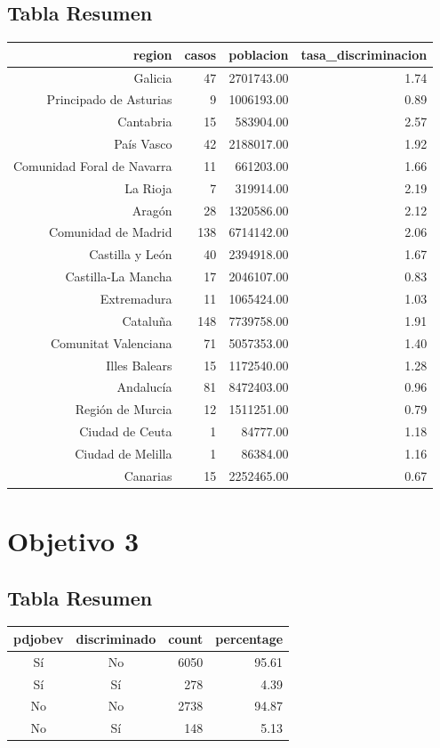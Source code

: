 \documentclass{article}
\begin{document}
\subsection{Tabla Resumen}
\begin{table}[ht]
\centering
\begin{tabular}{rrrr}
  \hline
region & casos & poblacion & tasa\_discriminacion \\ 
  \hline
Galicia &  47 & 2701743.00 & 1.74 \\ 
  Principado de Asturias &   9 & 1006193.00 & 0.89 \\ 
  Cantabria &  15 & 583904.00 & 2.57 \\ 
  País Vasco &  42 & 2188017.00 & 1.92 \\ 
  Comunidad Foral de Navarra &  11 & 661203.00 & 1.66 \\ 
  La Rioja &   7 & 319914.00 & 2.19 \\ 
  Aragón &  28 & 1320586.00 & 2.12 \\ 
  Comunidad de Madrid & 138 & 6714142.00 & 2.06 \\ 
  Castilla y León &  40 & 2394918.00 & 1.67 \\ 
  Castilla-La Mancha &  17 & 2046107.00 & 0.83 \\ 
  Extremadura &  11 & 1065424.00 & 1.03 \\ 
  Cataluña & 148 & 7739758.00 & 1.91 \\ 
  Comunitat Valenciana &  71 & 5057353.00 & 1.40 \\ 
  Illes Balears &  15 & 1172540.00 & 1.28 \\ 
  Andalucía &  81 & 8472403.00 & 0.96 \\ 
  Región de Murcia &  12 & 1511251.00 & 0.79 \\ 
  Ciudad de Ceuta &   1 & 84777.00 & 1.18 \\ 
  Ciudad de Melilla &   1 & 86384.00 & 1.16 \\ 
  Canarias &  15 & 2252465.00 & 0.67 \\ 
   \hline
\end{tabular}
\end{table}

\section*{Objetivo 3}
\subsection{Tabla Resumen}
\begin{table}[ht]
\centering
\begin{tabular}{ccrr}
  \hline
pdjobev & discriminado & count & percentage \\ 
  \hline
Sí & No & 6050 & 95.61 \\ 
  Sí & Sí & 278 & 4.39 \\ 
  No & No & 2738 & 94.87 \\ 
  No & Sí & 148 & 5.13 \\ 
   \hline
\end{tabular}
\end{table}
\end{document}
